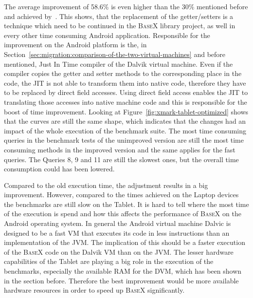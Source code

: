 The average improvement of 58.6\% is even higher than the 30\% mentioned before and achieved by~\cite{toninievlautatingandroid}.
This shows, that the replacement of the getter/setters is a technique which need to be continued in the \textsc{BaseX} library project, as well in every other time consuming Android application.
Responsible for the improvement on the Android platform is the, in Section~\ref{sec:migration:comparison-of-the-two-virtual-machines} and before mentioned, Just In Time compiler of the Dalvik virtual machine. 
Even if the compiler copies the getter and setter methods to the corresponding place in the code, the JIT is not able to transform them into native code, therefore they have to be replaced by direct field accesses.
Using direct field access enables the JIT to translating those accesses into native machine code and this is responsible for the boost of time improvement.
Looking at Figure~\ref{fig:xmark-tablet-optimized} shows that the curves are still the same shape, which indicates that the changes had an impact of the whole execution of the benchmark suite.
The most time consuming queries in the benchmark tests of the unimproved version are still the most time consuming methods in the improved version and the same applies for the fast queries.
The Queries 8, 9 and 11 are still the slowest ones, but the overall time consumption could has been lowered.



Compared to the old execution time, the adjustment results in a big improvement.
However, compared to the times achieved on the Laptop devices the benchmarks are still slow on the Tablet.
It is hard to tell where the most time of the execution is spend and how this affects the performance of \textsc{BaseX} on the Android operating system.
In general the Android virtual machine Dalvic is designed to be a fast VM that executes its code in less instructions than an implementation of the JVM.
The implication of this should be a faster execution of the \textsc{BaseX} code on the Dalvik VM than on the JVM.
The lesser hardware capabilities of the Tablet are playing a big role in the execution of the benchmarks, especially the available RAM for the DVM, which has been shown in the section before.
Therefore the best improvement would be more available hardware resources in order to speed up \textsc{BaseX} significantly.


